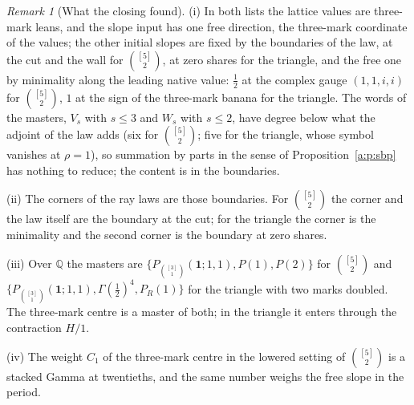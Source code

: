 \documentclass[11pt]{article}
\newcommand{\one}{\mathbf 1}
\newcommand{\Pth}{P_{\binom{[3]}1}(\one;1,1)}
\theoremstyle{plain}
\theoremstyle{definition}
\theoremstyle{remark}
\newtheorem{remark}[proposition]{Remark}
\begin{document}
\begin{remark}[What the closing found]\label{a:r:closingfound}
(i) In both lists the lattice values are three-mark leans, and the slope input has one free direction, the three-mark coordinate of the values; the other initial slopes are fixed by the boundaries of the law, at the cut and the wall for $\binom{[5]}2$, at zero shares for the triangle, and the free one by minimality along the leading native value: $\frac12$ at the complex gauge $(1,1,i,i)$ for $\binom{[5]}2$, $1$ at the sign of the three-mark banana for the triangle. The words of the masters, $V_s$ with $s\le3$ and $W_s$ with $s\le2$, have degree below what the adjoint of the law adds (six for $\binom{[5]}2$; five for the triangle, whose symbol vanishes at $\rho=1$), so summation by parts in the sense of Proposition~\ref{a:p:sbp} has nothing to reduce; the content is in the boundaries.

(ii) The corners of the ray laws are those boundaries. For $\binom{[5]}2$ the corner and the law itself are the boundary at the cut; for the triangle the corner is the minimality and the second corner is the boundary at zero shares.

(iii) Over $\mathbb Q$ the masters are $\{\Pth,P(1),P(2)\}$ for $\binom{[5]}2$ and $\{\Pth,\Gamma(\frac12)^4,P_R(1)\}$ for the triangle with two marks doubled. The three-mark centre is a master of both; in the triangle it enters through the contraction $H/1$.

(iv) The weight $C_1$ of the three-mark centre in the lowered setting of $\binom{[5]}2$ is a stacked Gamma at twentieths, and the same number weighs the free slope in the period.
\end{remark}
\end{document}
